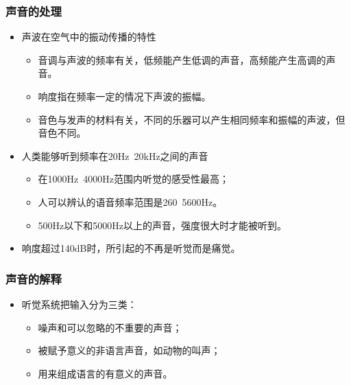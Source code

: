 \documentclass{beamer}
\begin{document}
\begin{frame}
	\frametitle{声音的处理}
	\beamertemplatetransparentcovereddynamicmedium 
	\begin{itemize}
		\item 声波在空气中的振动传播的特性
		\begin{itemize}
			\item 音调与声波的频率有关，低频能产生低调的声音，高频能产生高调的声音。
			\item 响度指在频率一定的情况下声波的振幅。
			\item 音色与发声的材料有关，不同的乐器可以产生相同频率和振幅的声波，但音色不同。
		\end{itemize}\pause
		\item 人类能够听到频率在20Hz~20kHz之间的声音
		\begin{itemize}
			\item 在1000Hz~4000Hz范围内听觉的感受性最高；
			\item 人可以辨认的语音频率范围是260~5600Hz。
			\item 500Hz以下和5000Hz以上的声音，强度很大时才能被听到。
		\end{itemize}\pause
		\item 响度超过140dB时，所引起的不再是听觉而是痛觉。
	\end{itemize}
\end{frame}

\begin{frame}
	\frametitle{声音的解释}
	\beamertemplatetransparentcovereddynamicmedium 
	\begin{itemize}[<+->]
		\item 听觉系统把输入分为三类：
		\begin{itemize}
			\item 噪声和可以忽略的不重要的声音；
			\item 被赋予意义的非语言声音，如动物的叫声；
			\item 用来组成语言的有意义的声音。
		\end{itemize}
	\end{itemize}
\end{frame}
\end{document}
